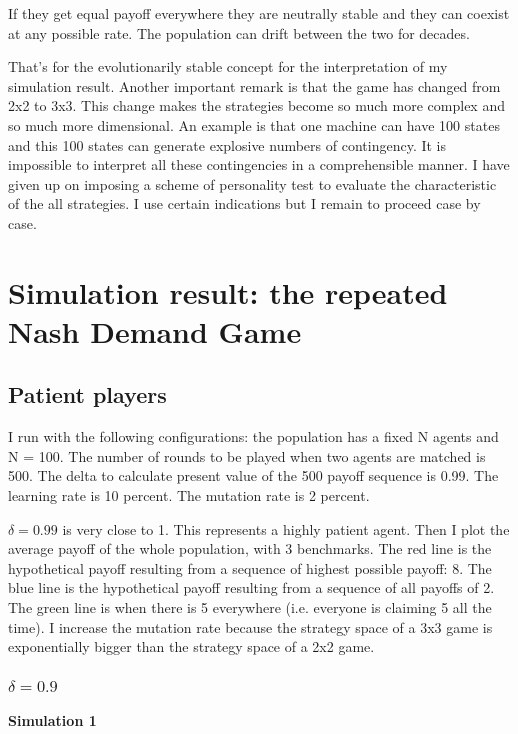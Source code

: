 \documentclass[12.5pt]{report}
\begin{document}
If they get equal payoff everywhere they are neutrally stable and they can coexist at any possible rate. The population can drift between the two for decades.

That's for the evolutionarily stable concept for the interpretation of my simulation result. Another important remark is that the game has changed from 2x2 to 3x3. This change makes the strategies become so much more complex and so much more dimensional. An example is that one machine can have 100 states and this 100 states can generate explosive numbers of contingency. It is impossible to interpret all these contingencies in a comprehensible manner. I have given up on imposing a scheme of personality test to evaluate the characteristic of the all strategies. I use certain indications but I remain to proceed case by case.\\

\chapter{Simulation result: the repeated Nash Demand Game}
\section{Patient players}

I run with the following configurations: the population has a fixed N agents and N = 100. The number of rounds to be played when two agents are matched is 500. The delta to calculate present value of the 500 payoff sequence is 0.99. The learning rate is 10 percent. The mutation rate is 2 percent.

$\delta = 0.99$ is very close to 1. This represents a highly patient agent. Then I plot the average payoff of the whole population, with 3 benchmarks. The red line is the hypothetical payoff resulting from a sequence of highest possible payoff: 8. The blue line is the hypothetical payoff resulting from a sequence of all payoffs of 2. The green line is when there is 5 everywhere (i.e. everyone is claiming 5 all the time). I increase the mutation rate because the strategy space of a 3x3 game is exponentially bigger than the strategy space of a 2x2 game.\\

\subsection{$\delta = 0.9$}

\subsubsection{Simulation 1}
\end{document}
